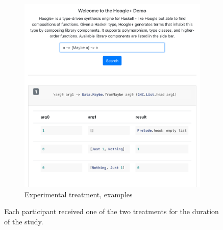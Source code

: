 \begin{figure}[t!]
\begin{subfigure}[t]{0.5\textwidth}
        \includegraphics[width=\textwidth]{method/treatment-ui.png}
        \caption{Experimental treatment, examples}
    \end{subfigure}
    \caption{Each participant received one of the two treatments for the duration of the study.}
\end{figure}
